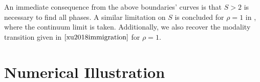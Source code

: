 \documentclass[%
 amsmath,amssymb,
 reprint,%
]{revtex4-2}
\begin{document}
An immediate consequence from the above boundaries' curves is that $S>2$ is necessary to find all phases. A similar limitation on $S$ is concluded for $\rho=1$ in \cite{xu2018immigration}, where the continuum limit is taken.  Additionally, we also recover the modality transition given in $\cite{xu2018immigration}$ for $\rho=1$.  

 








\section{Numerical Illustration}
\end{document}
